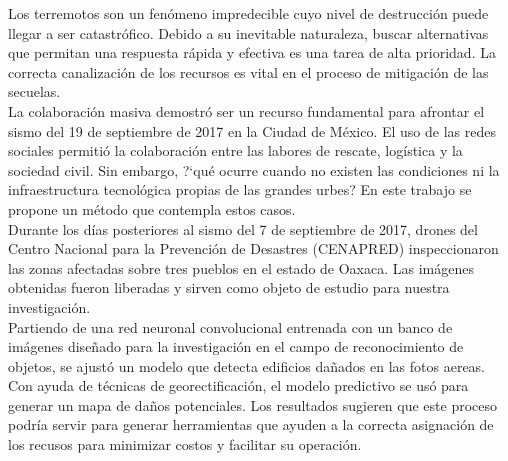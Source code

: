 Los terremotos son un fen\'omeno impredecible cuyo nivel de destrucci\'on puede llegar a ser catastr\'ofico. Debido a su inevitable naturaleza, buscar alternativas que permitan una respuesta r\'apida y efectiva es una tarea de alta prioridad. La correcta canalizaci\'on de los recursos es vital en el proceso de mitigaci\'on de las secuelas.\\

La colaboraci\'on masiva demostr\'o ser un recurso fundamental para afrontar el sismo del 19 de septiembre de 2017 en la Ciudad de M\'exico. El uso de las redes sociales permiti\'o la colaboraci\'on entre las labores de rescate, log\'istica y la sociedad civil. Sin embargo, ?`qu\'e ocurre cuando no existen las condiciones ni la infraestructura tecnol\'ogica propias de las grandes urbes? En este trabajo se propone un m\'etodo que contempla estos casos.\\

Durante los d\'ias posteriores al sismo del 7 de septiembre de 2017, drones del Centro Nacional para la Prevenci\'on de Desastres (CENAPRED) inspeccionaron las zonas afectadas sobre tres pueblos en el estado de Oaxaca. Las im\'agenes obtenidas fueron liberadas y sirven como objeto de estudio para nuestra investigaci\'on.\\

Partiendo de una red neuronal convolucional entrenada con un banco de im\'agenes dise\~nado para la investigaci\'on en el campo de reconocimiento de objetos, se ajust\'o un modelo que detecta edificios da\~nados en las fotos aereas. Con ayuda de t\'ecnicas de georectificaci\'on, el modelo predictivo se us\'o para generar un mapa de da\~nos potenciales. Los resultados sugieren que este proceso podr\'ia servir para generar herramientas que ayuden a la correcta asignaci\'on de los recusos para minimizar costos y facilitar su operaci\'on.